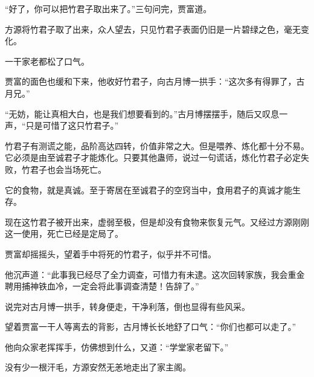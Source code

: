 \begin{this_body}
“好了，你可以把竹君子取出来了。”三句问完，贾富道。

方源将竹君子取了出来，众人望去，只见竹君子表面仍旧是一片碧绿之色，毫无变化。

一干家老都松了口气。

贾富的面色也缓和下来，他收好竹君子，向古月博一拱手：“这次多有得罪了，古月兄。”

“无妨，能让真相大白，也是我们想要看到的。”古月博摆摆手，随后又叹息一声，“只是可惜了这只竹君子。”

竹君子有测谎之能，品阶高达四转，价值非常之大。但是喂养、炼化都十分不易。它必须是由至诚君子才能炼化。只要其他蛊师，说过一句谎话，炼化竹君子必定失败，竹君子也会当场死亡。

它的食物，就是真诚。至于寄居在至诚君子的空窍当中，食用君子的真诚才能生存。

现在这竹君子被开出来，虚弱至极，但是却没有食物来恢复元气。又经过方源刚刚这一使用，死亡已经是定局了。

贾富却摇摇头，望着手中将死的竹君子，似乎并不可惜。

他沉声道：“此事我已经尽了全力调查，可惜力有未逮。这次回转家族，我会重金聘用捕神铁血冷，一定会将此事调查清楚！告辞了。”

说完对古月博一拱手，转身便走，干净利落，倒也显得有些风采。

望着贾富一干人等离去的背影，古月博长长地舒了口气：“你们也都可以走了。”

他向众家老挥挥手，仿佛想到什么，又道：“学堂家老留下。”

没有少一根汗毛，方源安然无恙地走出了家主阁。

\end{this_body}

